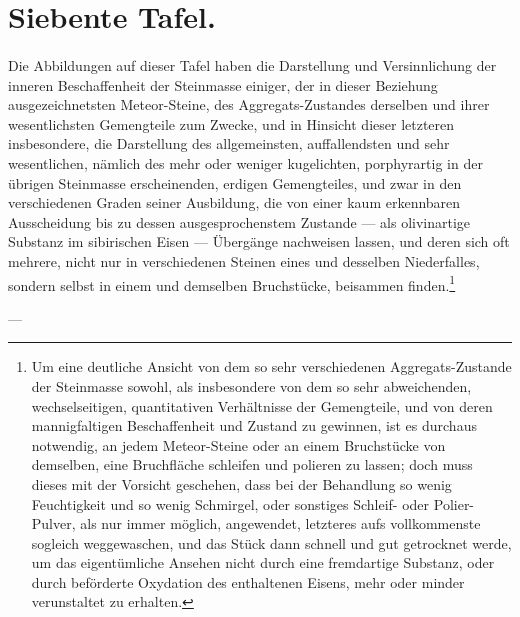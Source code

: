 \documentclass[a4paper, 11pt, oneside, german]{article}
\begin{document}
\section{Siebente Tafel.}
\paragraph{}
Die Abbildungen auf dieser Tafel haben die Darstellung und Versinnlichung der inneren Beschaffenheit der Steinmasse einiger, der in dieser Beziehung ausgezeichnetsten Meteor-Steine, des Aggregats-Zustandes derselben und ihrer wesentlichsten Gemengteile zum Zwecke, und in Hinsicht dieser letzteren insbesondere, die Darstellung des allgemeinsten, auffallendsten und sehr wesentlichen, nämlich des mehr oder weniger kugelichten, porphyrartig in der übrigen Steinmasse erscheinenden, erdigen Gemengteiles, und zwar in den verschiedenen Graden seiner Ausbildung, die von einer kaum erkennbaren Ausscheidung bis zu dessen ausgesprochenstem Zustande --- als olivinartige Substanz im sibirischen Eisen --- Übergänge nachweisen lassen, und deren sich oft mehrere, nicht nur in verschiedenen Steinen eines und desselben Niederfalles, sondern selbst in einem und demselben Bruchstücke, beisammen finden.\footnote{Um eine deutliche Ansicht von dem so sehr verschiedenen Aggregats-Zustande der Steinmasse sowohl, als insbesondere von dem so sehr abweichenden, wechselseitigen, quantitativen Verhältnisse der Gemengteile, und von deren mannigfaltigen Beschaffenheit und Zustand zu gewinnen, ist es durchaus notwendig, an jedem Meteor-Steine oder an einem Bruchstücke von demselben, eine Bruchfläche schleifen und polieren zu lassen; doch muss dieses mit der Vorsicht geschehen, dass bei der Behandlung so wenig Feuchtigkeit und so wenig Schmirgel, oder sonstiges Schleif- oder Polier-Pulver, als nur immer möglich, angewendet, letzteres aufs vollkommenste sogleich weggewaschen, und das Stück dann schnell und gut getrocknet werde, um das eigentümliche Ansehen nicht durch eine fremdartige Substanz, oder durch beförderte Oxydation des enthaltenen Eisens, mehr oder minder verunstaltet zu erhalten.}

---
\end{document}
